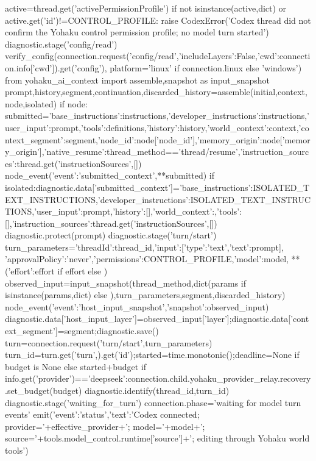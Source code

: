         active=thread.get('activePermissionProfile')
        if not isinstance(active,dict) or active.get('id')!=CONTROL_PROFILE:
            raise CodexError('Codex thread did not confirm the Yohaku control permission profile; no model turn started')
        diagnostic.stage('config/read')
        verify_config(connection.request('config/read',{'includeLayers':False,'cwd':connection.info['cwd']}).get('config'),
                      platform='linux' if connection.linux else 'windows')
        from yohaku_ai_context import assemble,snapshot as input_snapshot
        prompt,history,segment,continuation,discarded_history=assemble(initial,context,node,isolated)
        if node:
            submitted={'base_instructions':instructions,'developer_instructions':instructions,'user_input':prompt,'tools':definitions,'history':history,'world_context':context,'context_segment':segment,'node_id':node['node_id'],'memory_origin':node['memory_origin'],'native_resume':thread_method=='thread/resume','instruction_sources':thread.get('instructionSources',[])}
            node_event({'event':'submitted_context',**submitted})
        if isolated:diagnostic.data['submitted_context']={'base_instructions':ISOLATED_TEXT_INSTRUCTIONS,'developer_instructions':ISOLATED_TEXT_INSTRUCTIONS,'user_input':prompt,'history':[],'world_context':{},'tools':[],'instruction_sources':thread.get('instructionSources',[])}
        diagnostic.protect(prompt)
        diagnostic.stage('turn/start')
        turn_parameters={'threadId':thread_id,'input':[{'type':'text','text':prompt}],
            'approvalPolicy':'never','permissions':CONTROL_PROFILE,'model':model,
            **({'effort':effort} if effort else {})}
        observed_input=input_snapshot(thread_method,dict(params if isinstance(params,dict) else {}),turn_parameters,segment,discarded_history)
        node_event({'event':'host_input_snapshot','snapshot':observed_input})
        diagnostic.data['host_input_layer']=observed_input['layer'];diagnostic.data['context_segment']=segment;diagnostic.save()
        turn=connection.request('turn/start',turn_parameters)
        turn_id=turn.get('turn',{}).get('id');started=time.monotonic();deadline=None if budget is None else started+budget
        if info.get('provider')=='deepseek':connection.child.yohaku_provider_relay.recovery.set_budget(budget)
        diagnostic.identify(thread_id,turn_id)
        diagnostic.stage('waiting_for_turn')
        connection.phase='waiting for model turn events'
        emit({'event':'status','text':'Codex connected; provider='+effective_provider+'; model='+model+'; source='+tools.model_control.runtime['source']+'; editing through Yohaku world tools'})
